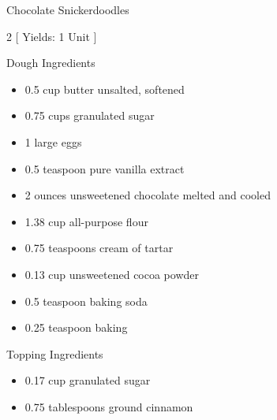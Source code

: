 \begin{Large}
    Chocolate Snickerdoodles
\end{Large}

\begin{scriptsize}
\begin{multicols}{2}
[
\vspace{1em}
Yields: 1 Unit
\vspace{-1.5em}
]

Dough Ingredients
\begin{itemize}
    \item 0.5 cup butter unsalted, softened
    \item 0.75 cups granulated sugar
    \item 1 large eggs
    \item 0.5 teaspoon pure vanilla extract
    \item 2 ounces unsweetened chocolate melted and cooled
    \item 1.38 cup all-purpose flour
    \item 0.75 teaspoons cream of tartar
    \item 0.13 cup unsweetened cocoa powder
    \item 0.5 teaspoon baking soda
    \item 0.25 teaspoon baking
\end{itemize}

Topping Ingredients
\begin{itemize}
    \item 0.17 cup granulated sugar
    \item 0.75 tablespoons ground cinnamon
\end{itemize}
\end{multicols}
\end{scriptsize}

